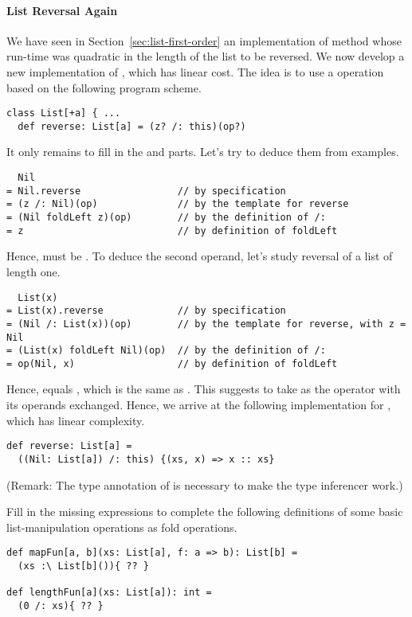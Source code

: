 \paragraph{List Reversal Again} We have seen in 
Section~\ref{sec:list-first-order} an implementation of method
 whose run-time was quadratic in the length of the list
to be reversed. We now develop a new implementation of ,
which has linear cost.  The idea is to use a 
operation based on the following program scheme.
\begin{lstlisting}
class List[+a] { ...
  def reverse: List[a] = (z? /: this)(op?)
\end{lstlisting}
It only remains to fill in the  and  parts.  Let's
try to deduce them from examples.
\begin{lstlisting}
  Nil
= Nil.reverse                 // by specification
= (z /: Nil)(op)              // by the template for reverse
= (Nil foldLeft z)(op)        // by the definition of /:
= z                           // by definition of foldLeft
\end{lstlisting}
Hence,  must be . To deduce the second operand,
let's study reversal of a list of length one.
\begin{lstlisting}
  List(x)
= List(x).reverse             // by specification
= (Nil /: List(x))(op)        // by the template for reverse, with z = Nil
= (List(x) foldLeft Nil)(op)  // by the definition of /:
= op(Nil, x)                  // by definition of foldLeft
\end{lstlisting}
Hence,  equals , which is the same
as . This suggests to take as  the
\code{::} operator with its operands exchanged.  Hence, we arrive at
the following implementation for , which has linear complexity.
\begin{lstlisting}
def reverse: List[a] =
  ((Nil: List[a]) /: this) {(xs, x) => x :: xs}
\end{lstlisting}
(Remark: The type annotation of  is necessary 
to make the type inferencer work.)

\begin{exercise} Fill in the missing expressions to complete the following
definitions of some basic list-manipulation operations as fold
operations.
\begin{lstlisting}
def mapFun[a, b](xs: List[a], f: a => b): List[b] = 
  (xs :\ List[b]()){ ?? }

def lengthFun[a](xs: List[a]): int =
  (0 /: xs){ ?? }
\end{lstlisting}
\end{exercise}

